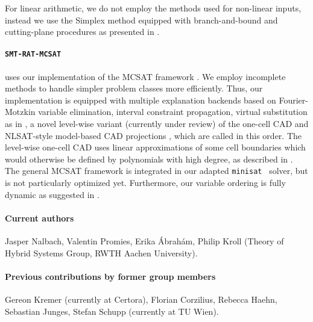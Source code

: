 \documentclass{article}
\begin{document}
For linear arithmetic, we do not employ the methods used for non-linear inputs, instead we use the Simplex method equipped with branch-and-bound and cutting-plane procedures as presented in \cite{DM06}.
\fi

\paragraph{\texttt{SMT-RAT-MCSAT}} uses our implementation of the MCSAT framework \cite{Moura2013}.
We employ incomplete methods to handle simpler problem classes more efficiently.
Thus, our implementation is equipped with multiple explanation backends based on Fourier-Motzkin variable elimination, interval constraint propagation, virtual substitution as in \cite{Abraham2017}, a novel level-wise variant (currently under review) of the one-cell CAD \cite{brown2015constructing} and NLSAT-style model-based CAD projections \cite{jovanovic2012solving}, which are called in this order.
The level-wise one-cell CAD uses linear approximations of some cell boundaries which would otherwise be defined by polynomials with high degree, as described in \cite{promies_msc}.
The general MCSAT framework is integrated in our adapted \texttt{minisat}~\cite{Een2003} solver, but is not particularly optimized yet.
Furthermore, our variable ordering is fully dynamic as suggested in \cite{Jovanovic2013}. %


\paragraph{Current authors}
Jasper Nalbach, Valentin Promies, Erika \'Abrah\'am, Philip Kroll
(Theory of Hybrid Systems Group, RWTH Aachen University).

\paragraph{Previous contributions by former group members}
Gereon Kremer (currently at Certora),
Florian Corzilius,
Rebecca Haehn,
Sebastian Junges,
Stefan Schupp (currently at TU Wien).




\end{document}
